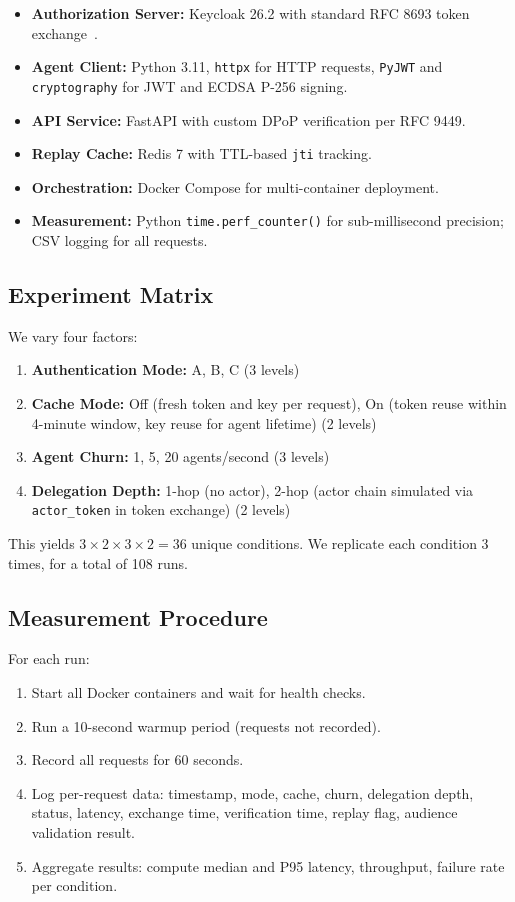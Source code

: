 \documentclass[conference,10pt]{IEEEtran}
\begin{document}
\begin{itemize}
    \item \textbf{Authorization Server:} Keycloak 26.2 with standard RFC 8693 token exchange~\cite{keycloak_token_exchange, keycloak_token_exchange_262}.
    \item \textbf{Agent Client:} Python 3.11, \texttt{httpx} for HTTP requests, \texttt{PyJWT} and \texttt{cryptography} for JWT and ECDSA P-256 signing.
    \item \textbf{API Service:} FastAPI with custom DPoP verification per RFC 9449.
    \item \textbf{Replay Cache:} Redis 7 with TTL-based \texttt{jti} tracking.
    \item \textbf{Orchestration:} Docker Compose for multi-container deployment.
    \item \textbf{Measurement:} Python \texttt{time.perf\_counter()} for sub-millisecond precision; CSV logging for all requests.
\end{itemize}

\subsection{Experiment Matrix}

We vary four factors:

\begin{enumerate}
    \item \textbf{Authentication Mode:} A, B, C (3 levels)
    \item \textbf{Cache Mode:} Off (fresh token and key per request), On (token reuse within 4-minute window, key reuse for agent lifetime) (2 levels)
    \item \textbf{Agent Churn:} 1, 5, 20 agents/second (3 levels)
    \item \textbf{Delegation Depth:} 1-hop (no actor), 2-hop (actor chain simulated via \texttt{actor\_token} in token exchange) (2 levels)
\end{enumerate}

This yields $3 \times 2 \times 3 \times 2 = 36$ unique conditions. We replicate each condition 3 times, for a total of 108 runs.

\subsection{Measurement Procedure}

For each run:
\begin{enumerate}
    \item Start all Docker containers and wait for health checks.
    \item Run a 10-second warmup period (requests not recorded).
    \item Record all requests for 60 seconds.
    \item Log per-request data: timestamp, mode, cache, churn, delegation depth, status, latency, exchange time, verification time, replay flag, audience validation result.
    \item Aggregate results: compute median and P95 latency, throughput, failure rate per condition.
\end{enumerate}
\end{document}
